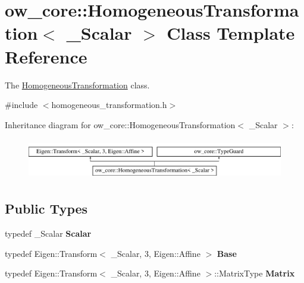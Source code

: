 \hypertarget{classow__core_1_1HomogeneousTransformation}{}\section{ow\+\_\+core\+:\+:Homogeneous\+Transformation$<$ \+\_\+\+Scalar $>$ Class Template Reference}
\label{classow__core_1_1HomogeneousTransformation}


The \hyperlink{classow__core_1_1HomogeneousTransformation}{Homogeneous\+Transformation} class.  




{\ttfamily \#include $<$homogeneous\+\_\+transformation.\+h$>$}

Inheritance diagram for ow\+\_\+core\+:\+:Homogeneous\+Transformation$<$ \+\_\+\+Scalar $>$\+:\begin{figure}[H]
\begin{center}
\leavevmode
\includegraphics[height=1.824104cm]{d5/de4/classow__core_1_1HomogeneousTransformation}
\end{center}
\end{figure}
\subsection*{Public Types}
\begin{DoxyCompactItemize}
\item 
typedef \+\_\+\+Scalar {\bfseries Scalar}\hypertarget{classow__core_1_1HomogeneousTransformation_a831cf394e7c5ef71aa2384c942d353cc}{}\label{classow__core_1_1HomogeneousTransformation_a831cf394e7c5ef71aa2384c942d353cc}

\item 
typedef Eigen\+::\+Transform$<$ \+\_\+\+Scalar, 3, Eigen\+::\+Affine $>$ {\bfseries Base}\hypertarget{classow__core_1_1HomogeneousTransformation_a139a040b2aaf4205cd2ee48efcda3a5a}{}\label{classow__core_1_1HomogeneousTransformation_a139a040b2aaf4205cd2ee48efcda3a5a}

\item 
typedef Eigen\+::\+Transform$<$ \+\_\+\+Scalar, 3, Eigen\+::\+Affine $>$\+::Matrix\+Type {\bfseries Matrix}\hypertarget{classow__core_1_1HomogeneousTransformation_a1ce471e38a5056c8e97409a1c3bd9798}{}\label{classow__core_1_1HomogeneousTransformation_a1ce471e38a5056c8e97409a1c3bd9798}

\end{DoxyCompactItemize}
